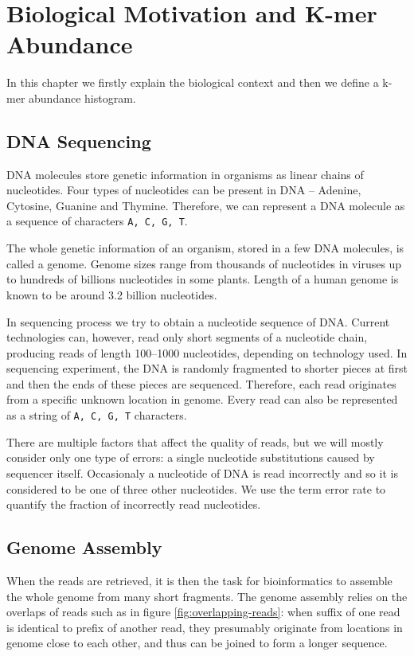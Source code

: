 \chapter{Biological Motivation and K-mer Abundance}

In this chapter we firstly explain the biological context and then we define a k-mer abundance histogram.

\section{DNA Sequencing}

DNA molecules store genetic information in organisms as linear chains of nucleotides.
Four types of nucleotides can be present in DNA -- Adenine, Cytosine, Guanine and Thymine.
Therefore, we can represent a DNA molecule as a sequence of characters \texttt{A, C, G, T}.

The whole genetic information of an organism, stored in a few DNA molecules, is called a genome.
Genome sizes range from thousands of nucleotides in viruses up to hundreds of billions nucleotides in some plants.
Length of a human genome is known to be around 3.2 billion nucleotides.

In sequencing process we try to obtain a nucleotide sequence of DNA. Current technologies can, however, read only
short segments of a nucleotide chain, producing reads of length 100--1000 nucleotides, depending on technology used. 
In sequencing experiment, the DNA is randomly fragmented to shorter pieces at first and then the ends of these pieces are sequenced.
Therefore, each read originates from a specific unknown location in genome. Every read can also be represented as a string of \texttt{A, C, G, T} characters.

There are multiple factors that affect the quality of reads, but we will mostly consider only one type of errors: 
a single nucleotide substitutions caused by sequencer itself. Occasionaly a nucleotide of DNA is
read incorrectly and so it is considered to be one of three other nucleotides. We use the term error rate to
quantify the fraction of incorrectly read nucleotides.

\section{Genome Assembly}

When the reads are retrieved, it is then the task for bioinformatics to assemble the whole genome from many short fragments.
The genome assembly relies on the overlaps of reads such as in figure \ref{fig:overlapping-reads}:
when suffix of one read is identical to prefix of another read, they presumably originate from locations in genome close to each other,
and thus can be joined to form a longer sequence.

